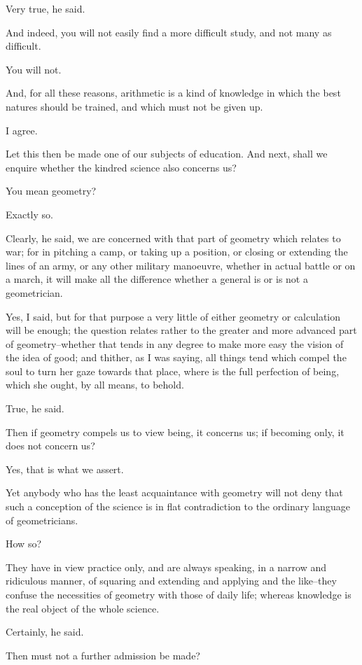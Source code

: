 Very true, he said.

And indeed, you will not easily find a more difficult study, and not
many as difficult.

You will not.

And, for all these reasons, arithmetic is a kind of knowledge in which
the best natures should be trained, and which must not be given up.

I agree.

Let this then be made one of our subjects of education. And next, shall
we enquire whether the kindred science also concerns us?

You mean geometry?

Exactly so.

Clearly, he said, we are concerned with that part of geometry which
relates to war; for in pitching a camp, or taking up a position,
or closing or extending the lines of an army, or any other military
manoeuvre, whether in actual battle or on a march, it will make all the
difference whether a general is or is not a geometrician.

Yes, I said, but for that purpose a very little of either geometry or
calculation will be enough; the question relates rather to the greater
and more advanced part of geometry--whether that tends in any degree
to make more easy the vision of the idea of good; and thither, as I was
saying, all things tend which compel the soul to turn her gaze towards
that place, where is the full perfection of being, which she ought, by
all means, to behold.

True, he said.

Then if geometry compels us to view being, it concerns us; if becoming
only, it does not concern us?

Yes, that is what we assert.

Yet anybody who has the least acquaintance with geometry will not deny
that such a conception of the science is in flat contradiction to the
ordinary language of geometricians.

How so?

They have in view practice only, and are always speaking, in a narrow
and ridiculous manner, of squaring and extending and applying and the
like--they confuse the necessities of geometry with those of daily life;
whereas knowledge is the real object of the whole science.

Certainly, he said.

Then must not a further admission be made?

